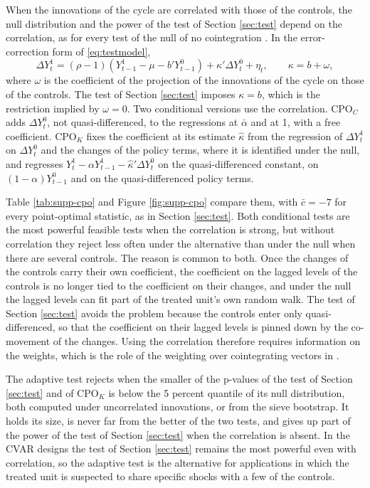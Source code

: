 \documentclass[12pt,a4paper]{article}
\theoremstyle{definition}
\begin{document}
When the innovations of the cycle are correlated with those of the controls, the null distribution and the power of the test of Section \ref{sec:test} depend on the correlation, as for every test of the null of no cointegration \citep{Pesavento2004}. In the error-correction form of \eqref{eq:testmodel},
\[
\Delta Y^1_t=(\rho-1)(Y^1_{t-1}-\mu-b'Y^0_{t-1})+\kappa'\Delta Y^0_t+\eta_t,\qquad \kappa=b+\omega,
\]
where $\omega$ is the coefficient of the projection of the innovations of the cycle on those of the controls. The test of Section \ref{sec:test} imposes $\kappa=b$, which is the restriction implied by $\omega=0$. Two conditional versions use the correlation. CPO$_C$ adds $\Delta Y^0_t$, not quasi-differenced, to the regressions at $\bar\alpha$ and at 1, with a free coefficient. CPO$_K$ fixes the coefficient at its estimate $\hat\kappa$ from the regression of $\Delta Y^1_t$ on $\Delta Y^0_t$ and the changes of the policy terms, where it is identified under the null, and regresses $Y^1_t-\alpha Y^1_{t-1}-\hat\kappa'\Delta Y^0_t$ on the quasi-differenced constant, on $(1-\alpha)Y^0_{t-1}$ and on the quasi-differenced policy terms.

Table \ref{tab:supp-cpo} and Figure \ref{fig:supp-cpo} compare them, with $\bar c=-7$ for every point-optimal statistic, as in Section \ref{sec:test}. Both conditional tests are the most powerful feasible tests when the correlation is strong, but without correlation they reject less often under the alternative than under the null when there are several controls. The reason is common to both. Once the changes of the controls carry their own coefficient, the coefficient on the lagged levels of the controls is no longer tied to the coefficient on their changes, and under the null the lagged levels can fit part of the treated unit's own random walk. The test of Section \ref{sec:test} avoids the problem because the controls enter only quasi-differenced, so that the coefficient on their lagged levels is pinned down by the co-movement of the changes. Using the correlation therefore requires information on the weights, which is the role of the weighting over cointegrating vectors in \citet{ElliottPesavento2009}.

The adaptive test rejects when the smaller of the p-values of the test of Section \ref{sec:test} and of CPO$_K$ is below the 5 percent quantile of its null distribution, both computed under uncorrelated innovations, or from the sieve bootstrap. It holds its size, is never far from the better of the two tests, and gives up part of the power of the test of Section \ref{sec:test} when the correlation is absent. In the CVAR designs the test of Section \ref{sec:test} remains the most powerful even with correlation, so the adaptive test is the alternative for applications in which the treated unit is suspected to share specific shocks with a few of the controls.
\end{document}
